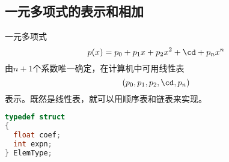 \subsection{一元多项式的表示和相加}

\begin{frame}
一元多项式
$$
p(x)=p_0+p_1x+p_2x^2+\cd+p_nx^n
$$
由$n+1$个系数唯一确定，在计算机中可用线性表
$$
(p_0,p_1,p_2,\cd,p_n)
$$
表示。既然是线性表，就可以用顺序表和链表来实现。
\end{frame}

\begin{frame}[fragile]
\begin{dingyi}[顺序存储表示的类型]
\begin{lstlisting}[language=C,basicstyle=\ttfamily\small]
typedef struct
{
  float coef;
  int expn;
} ElemType;
\end{lstlisting}
\end{dingyi}
\end{frame}

